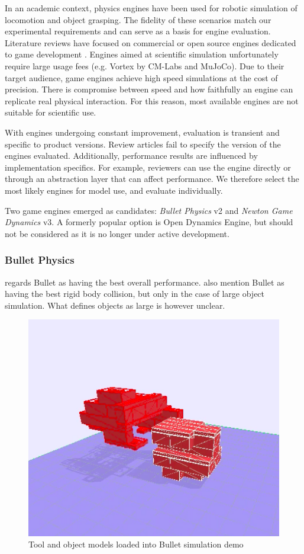 \documentclass[11]{article}
\let \citeA \textcite
\begin{document}
In an academic context, physics engines have been used for robotic simulation of locomotion and object grasping.
The fidelity of these scenarios match our experimental requirements and can serve as a basis for engine evaluation. 
Literature reviews have focused on commercial or open source engines dedicated to game development \cite{boeing2007,roennau2013,hummel2012}. 
Engines aimed at scientific simulation unfortunately require large usage fees (e.g. Vortex by CM-Labs and MuJoCo).
Due to their target audience, game engines achieve high speed simulations at the cost of precision. 
There is compromise between speed and how faithfully an engine can replicate real physical interaction.
For this reason, most available engines are not suitable for scientific use. 

With engines undergoing constant improvement, evaluation is transient and specific to product versions. 
Review articles fail to specify the version of the engines evaluated.
Additionally, performance results are influenced by implementation specifics.
For example, reviewers can use the engine directly or through an abstraction layer that can affect performance.  
We therefore select the most likely engines for model use, and evaluate individually. 

Two game engines emerged as candidates: \emph{Bullet Physics} v2 and \emph{Newton Game Dynamics} v3.
A formerly popular option is Open Dynamics Engine, but should not be considered as it is no longer under active development. 

\subsubsection{Bullet Physics}
\citeA{boeing2007} regards Bullet as having the best overall performance. 
\citeA{hummel2012,roennau2013} also mention Bullet as having the best rigid body collision, but only in the case of large object simulation.
What defines objects as large is however unclear. 

\begin{figure}[h]
  \centering
  \includegraphics[width=.5\textwidth]{figures/bullet_demo.png}
  \caption{Tool and object models loaded into Bullet simulation demo}
  \label{fig:bullet_demo}
\end{figure}      
\end{document}
